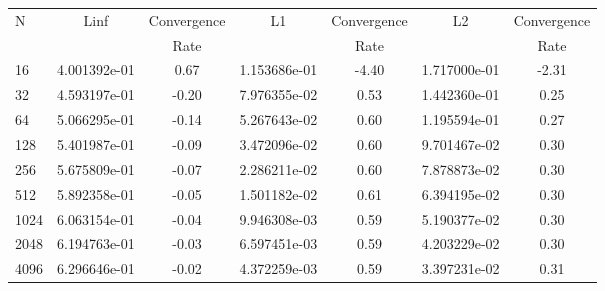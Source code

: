 \documentclass[12pt]{article}
\begin{document}
	\begin{tabular}{l|c|c|c|c|c|c}
		N&Linf&Convergence&L1&Convergence&L2&Convergence\\
		&&Rate&&Rate&&Rate\\
		\hline
		16&4.001392e-01&0.67&1.153686e-01&-4.40&1.717000e-01&-2.31\\
		\hline
		32&4.593197e-01&-0.20&7.976355e-02&0.53&1.442360e-01&0.25\\
		\hline
		64&5.066295e-01&-0.14&5.267643e-02&0.60&1.195594e-01&0.27\\
		\hline
		128&5.401987e-01&-0.09&3.472096e-02&0.60&9.701467e-02&0.30\\
		\hline
		256&5.675809e-01&-0.07&2.286211e-02&0.60&7.878873e-02&0.30\\
		\hline
		512&5.892358e-01&-0.05&1.501182e-02&0.61&6.394195e-02&0.30\\
		\hline
		1024&6.063154e-01&-0.04&9.946308e-03&0.59&5.190377e-02&0.30\\
		\hline
		2048&6.194763e-01&-0.03&6.597451e-03&0.59&4.203229e-02&0.30\\
		\hline
		4096&6.296646e-01&-0.02&4.372259e-03&0.59&3.397231e-02&0.31\\
	\end{tabular}
\end{document}
